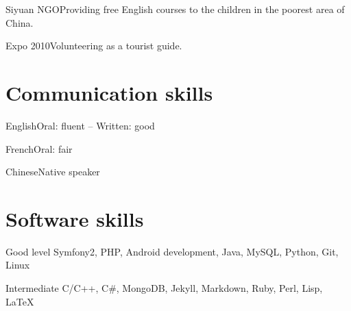 \documentclass{tccv}
\begin{document}
\begin{factlist}
\item{Siyuan NGO}{Providing free English courses to the children in the poorest area of China.}
\item{Expo 2010}{Volunteering as a tourist guide.}
\end{factlist}

\section{Communication skills}

\begin{factlist}
\item{English}{Oral: fluent -- Written: good}
\item{French}{Oral: fair}
\item{Chinese}{Native speaker}
\end{factlist}

\section{Software skills}

\begin{factlist}

\item{Good level}
     {Symfony2, PHP, Android development, Java, MySQL, Python, Git, Linux}

\item{Intermediate}
     {C/C++, C\#, MongoDB, Jekyll, Markdown, Ruby, Perl, Lisp, LaTeX}

\end{factlist}
\end{document}
